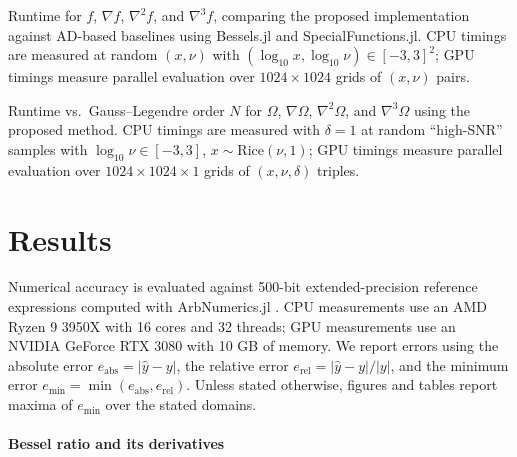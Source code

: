 \documentclass{article}
\begin{document}
\begin{table}[h]
  \centering
  \caption{Runtime for $f$, $\nabla f$, $\nabla^2 f$, and $\nabla^3 f$, comparing the proposed implementation against AD-based baselines using Bessels.jl and SpecialFunctions.jl. CPU timings are measured at random $(x,\nu)$ with $(\log_{10} x, \log_{10} \nu) \in [-3, 3]^2$; GPU timings measure parallel evaluation over $1024 \times 1024$ grids of $(x,\nu)$ pairs.}
  \label{tab:rician-performance}
  \resizebox{\textwidth}{!}{}
\end{table}

\begin{table}[h]
  \centering
  \caption{Runtime vs.\ Gauss--Legendre order $N$ for $\Omega$, $\nabla\Omega$, $\nabla^2\Omega$, and $\nabla^3\Omega$ using the proposed method. CPU timings are measured with $\delta = 1$ at random ``high-SNR'' samples with $\log_{10} \nu \in [-3, 3]$, $x \sim \mathrm{Rice}(\nu,1)$; GPU timings measure parallel evaluation over $1024 \times 1024 \times 1$ grids of $(x, \nu, \delta)$ triples.}
  \label{tab:qrician-performance}
  
\end{table}

\section{Results}

Numerical accuracy is evaluated against 500-bit extended-precision reference expressions computed with ArbNumerics.jl \citep{johansson_arb_2014}.
CPU measurements use an AMD Ryzen 9 3950X with 16 cores and 32 threads;
GPU measurements use an NVIDIA GeForce RTX 3080 with 10 GB of memory.
We report errors using the absolute error $e_{\mathrm{abs}} = |\hat{y} - y|$, the relative error $e_{\mathrm{rel}} = |\hat{y} - y| / |y|$, and the minimum error $e_{\min} = \min(e_{\mathrm{abs}}, e_{\mathrm{rel}})$.
Unless stated otherwise, figures and tables report maxima of $e_{\min}$ over the stated domains.

\paragraph{Bessel ratio and its derivatives}
\end{document}
